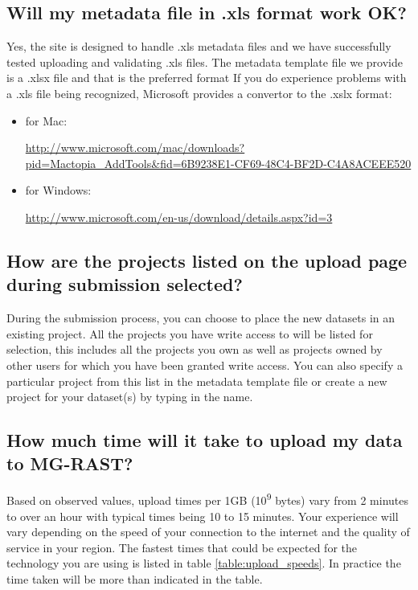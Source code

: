 \documentclass[12pt,fullpage]{report}
\begin{document}
\subsection*{Will my metadata file in .xls format work OK?}
Yes, the site is designed to handle .xls metadata files and we have successfully tested uploading and validating .xls files. The metadata template file we provide is a .xlsx file and that is the preferred format
If you do experience problems with a .xls file being recognized, Microsoft provides a convertor to the .xslx format:
\begin{itemize}
\item  for Mac: \begin{small}\url{http://www.microsoft.com/mac/downloads?pid=Mactopia\_AddTools\&fid=6B9238E1-CF69-48C4-BF2D-C4A8ACEEE520}\end{small}
\item  for Windows: \begin{small}\url{http://www.microsoft.com/en-us/download/details.aspx?id=3}\end{small}
\end{itemize}
\subsection*{How are the projects listed on the upload page during submission selected?}
During the submission process, you can choose to place the new datasets in an existing project. All the projects you have write access to will be listed for selection, this includes all the projects you own as well as projects owned by other users for which you have been granted write access.
You can also specify a particular project from this list in the metadata template file or create a new project for your dataset(s) by typing in the name.
\subsection*{How much time will it take to upload my data to MG-RAST?}
Based on observed values, upload times per 1GB (10\textsuperscript{9} bytes) vary from 2 minutes to over an hour with typical times being 10 to 15 minutes. Your experience will vary depending on the speed of your connection to the internet and the quality of service in your region.
The fastest times that could be expected for the technology you are using is listed in table \ref{table:upload_speeds}. In practice the time taken will be more than indicated in the table.
\end{document}
